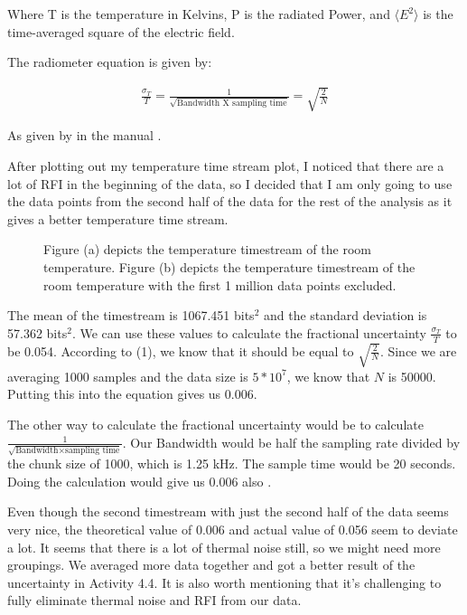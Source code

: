 \documentclass[10pt, preprint]{aastex}
\begin{document}
Where T is the temperature in Kelvins, P is the radiated Power, and $\langle E^2 \rangle$ is the time-averaged square of the electric field.

The radiometer equation is given by:

\begin{align}
    \frac{\sigma_T}{T} = \frac{1}{\sqrt{\text{Bandwidth X sampling time}}} = \sqrt{\frac{2}{N}}
\end{align}

As given by in the manual \cite{labmanual}.

After plotting out my temperature time stream plot, I noticed that there are a lot of RFI in the beginning of the data, so I decided that I am only going to use the data points from the second half of the data for the rest of the analysis as it gives a better temperature time stream. 

\begin{figure}[H]
  \centering
  \hfill
  \caption{\label{fig:timetemp2} Figure (a) depicts the temperature timestream of the room temperature. Figure (b) depicts the temperature timestream of the room temperature with the first 1 million data points excluded. }
\end{figure}

The mean of the timestream is 1067.451 bits$^2$ and the standard deviation is 57.362 bits$^2$. We can use these values to calculate the fractional uncertainty \(\frac{\sigma_T}{T}\) to be 0.054. According to (1), we know that it should be equal to \(\sqrt{\frac{2}{N}}\). Since we are averaging 1000 samples and the data size is \(5*10^7\), we know that \(N\) is 50000. Putting this into the equation gives us 0.006. 

The other way to calculate the fractional uncertainty would be to calculate \(\frac{1}{\sqrt{\text{Bandwidth} \times \text{sampling time}}}\). Our Bandwidth would be half the sampling rate divided by the chunk size of 1000, which is 1.25 kHz. The sample time would be 20 seconds. Doing the calculation would give us 0.006 also \cite{labmanual}.

Even though the second timestream with just the second half of the data seems very nice, the theoretical value of 0.006 and actual value of 0.056 seem to deviate a lot. It seems that there is a lot of thermal noise still, so we might need more groupings. We averaged more data together and got a better result of the uncertainty in Activity 4.4. It is also worth mentioning that it’s challenging to fully eliminate thermal noise and RFI from our data.
\end{document}
